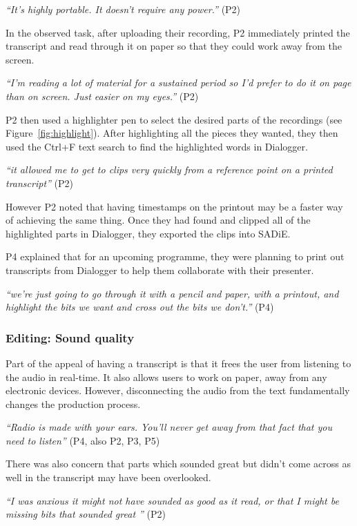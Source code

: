 \textit{``It's highly portable. It doesn't require any power.''} (P2)

In the observed task, after uploading their recording, P2 immediately printed
the transcript and read through it on paper so that they could work away from
the screen.

\textit{``I'm reading a lot of material for a sustained period so I'd prefer to do it on page than on screen. Just
  easier on my eyes.''} (P2)


P2 then used a highlighter pen to select the desired parts of the recordings (see Figure~\ref{fig:highlight}).  After
highlighting all the pieces they wanted,
they then used the Ctrl+F text search to find the highlighted words in Dialogger.

\textit{``it allowed me to get to clips very quickly from a reference point on a printed transcript''} (P2)

However P2 noted that having timestamps on the printout may be a faster
way of achieving the same thing.
Once they had found and clipped all of the highlighted parts in Dialogger, they exported the clips into SADiE.

P4 explained that for an upcoming programme, they were
planning to print out transcripts from Dialogger to help
them collaborate with their presenter.

\textit{``we're just going to go through it with a pencil and paper, with a
  printout, and highlight the bits we want and cross out the bits we don't.''}
(P4)

\subsubsection{Editing: Sound quality}
Part of the appeal of having a transcript is that it frees the user from listening to the audio in real-time. It also
allows users to work on paper, away from any electronic devices. However, disconnecting the audio from the text
fundamentally changes the production process.

\textit{``Radio is made with your ears. You'll never get away from that fact that you need to listen''} (P4, also P2,
P3, P5)

There was also concern that parts which sounded great but didn't come across as well in the transcript may have been
overlooked.

\textit{``I was anxious it might not have sounded as good as it read, or that I might be missing bits that sounded
  great ''} (P2)

